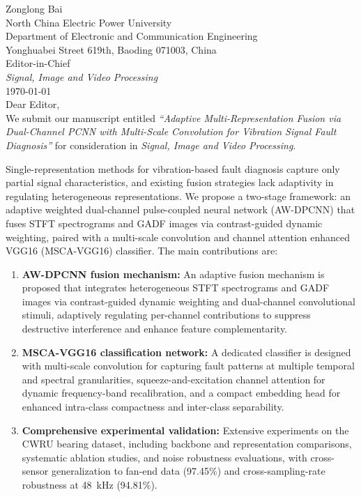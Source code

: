 \documentclass[a4paper,12pt]{article}
\begin{document}
\noindent Zonglong Bai\\
North China Electric Power University\\
Department of Electronic and Communication Engineering\\
Yonghuabei Street 619th, Baoding 071003, China\\[0.25em]

\noindent Editor-in-Chief\\
\textit{Signal, Image and Video Processing}\\[0.25em]

\noindent \today\\[0.25em]

\noindent Dear Editor,\\[0.25em]
We submit our manuscript entitled \textit{``Adaptive Multi-Representation Fusion via Dual-Channel PCNN with Multi-Scale Convolution for Vibration Signal Fault Diagnosis''} for consideration in \textit{Signal, Image and Video Processing}.

Single-representation methods for vibration-based fault diagnosis capture only partial signal characteristics, and existing fusion strategies lack adaptivity in regulating heterogeneous representations. We propose a two-stage framework: an adaptive weighted dual-channel pulse-coupled neural network (AW-DPCNN) that fuses STFT spectrograms and GADF images via contrast-guided dynamic weighting, paired with a multi-scale convolution and channel attention enhanced VGG16 (MSCA-VGG16) classifier. The main contributions are:

\begin{enumerate}
	\item \textbf{AW-DPCNN fusion mechanism:} An adaptive fusion mechanism is proposed that integrates heterogeneous STFT spectrograms and GADF images via contrast-guided dynamic weighting and dual-channel convolutional stimuli, adaptively regulating per-channel contributions to suppress destructive interference and enhance feature complementarity.
	\item \textbf{MSCA-VGG16 classification network:} A dedicated classifier is designed with multi-scale convolution for capturing fault patterns at multiple temporal and spectral granularities, squeeze-and-excitation channel attention for dynamic frequency-band recalibration, and a compact embedding head for enhanced intra-class compactness and inter-class separability.
	\item \textbf{Comprehensive experimental validation:} Extensive experiments on the CWRU bearing dataset, including backbone and representation comparisons, systematic ablation studies, and noise robustness evaluations, with cross-sensor generalization to fan-end data (97.45\%) and cross-sampling-rate robustness at 48~kHz (94.81\%).
\end{enumerate}
\end{document}
